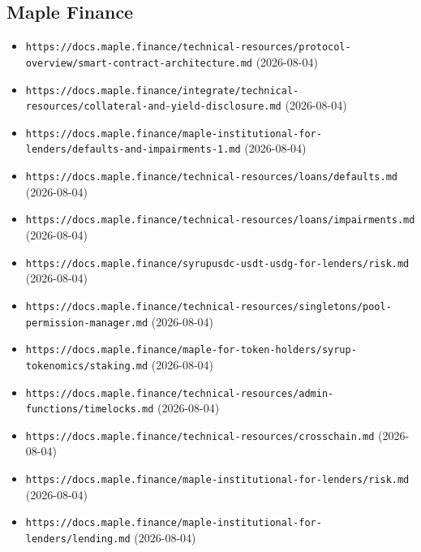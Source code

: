 \subsection*{Maple Finance}
\begin{itemize}\setlength{\itemsep}{0pt}\small
\item \texttt{https://docs.maple.finance/technical-resources/protocol-overview/smart-contract-architecture.md} (2026-08-04)
\item \texttt{https://docs.maple.finance/integrate/technical-resources/collateral-and-yield-disclosure.md} (2026-08-04)
\item \texttt{https://docs.maple.finance/maple-institutional-for-lenders/defaults-and-impairments-1.md} (2026-08-04)
\item \texttt{https://docs.maple.finance/technical-resources/loans/defaults.md} (2026-08-04)
\item \texttt{https://docs.maple.finance/technical-resources/loans/impairments.md} (2026-08-04)
\item \texttt{https://docs.maple.finance/syrupusdc-usdt-usdg-for-lenders/risk.md} (2026-08-04)
\item \texttt{https://docs.maple.finance/technical-resources/singletons/pool-permission-manager.md} (2026-08-04)
\item \texttt{https://docs.maple.finance/maple-for-token-holders/syrup-tokenomics/staking.md} (2026-08-04)
\item \texttt{https://docs.maple.finance/technical-resources/admin-functions/timelocks.md} (2026-08-04)
\item \texttt{https://docs.maple.finance/technical-resources/crosschain.md} (2026-08-04)
\item \texttt{https://docs.maple.finance/maple-institutional-for-lenders/risk.md} (2026-08-04)
\item \texttt{https://docs.maple.finance/maple-institutional-for-lenders/lending.md} (2026-08-04)
\end{itemize}

